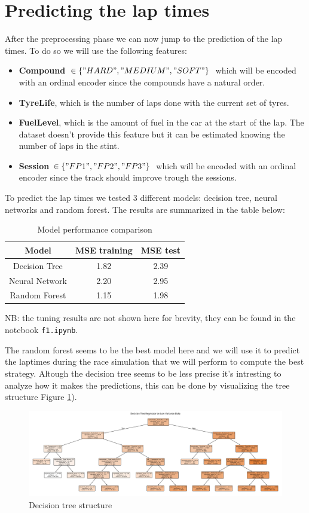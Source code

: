 \documentclass[12pt,a4paper]{article}
\begin{document}
\section{Predicting the lap times}
After the preprocessing phase we can now jump to the prediction of the lap times. To do so we will use the following features:
\begin{itemize}
    \item \textbf{Compound} \(\in \{"HARD", "MEDIUM", "SOFT"\}\)\ which will be encoded with an ordinal encoder since the compounds have a natural order.
    \item \textbf{TyreLife}, which is the number of laps done with the current set of tyres.
    \item \textbf{FuelLevel}, which is the amount of fuel in the car at the start of the lap. The dataset doesn't provide this feature but it can be estimated knowing the number of laps in the stint.
    \item \textbf{Session} \(\in \{"FP1", "FP2", "FP3"\}\)\ which will be encoded with an ordinal encoder since the track should improve trough the sessions.
\end{itemize}
To predict the lap times we tested 3 different models: decision tree, neural networks and random forest. The results are summarized in the table below:
\begin{table}[h!]
    \centering
    \begin{tabular}{|c|c|c|}
        \hline
        Model & MSE training & MSE test \\
        \hline
        Decision Tree & 1.82 & 2.39 \\
        Neural Network & 2.20 & 2.95 \\
        Random Forest & 1.15 & 1.98 \\
        \hline
    \end{tabular}
    \caption{Model performance comparison}
    \label{tab:model_performance}
\end{table}

NB: the tuning results are not shown here for brevity, they can be found in the notebook \texttt{f1.ipynb}.

The random forest seems to be the best model here and we will use it to predict the laptimes during the race simulation that we will perform to compute the best strategy. Altough the decision tree seems to be less precise it's intresting to analyze how it makes the predictions, this can be done by visualizing the tree structure Figure \ref{fig:decision_tree}).
\begin{figure}
    \centering
    \includegraphics[width=1\textheight,keepaspectratio]{decision_tree.png}
    \caption{Decision tree structure}
    \label{fig:decision_tree}
\end{figure}
\end{document}
